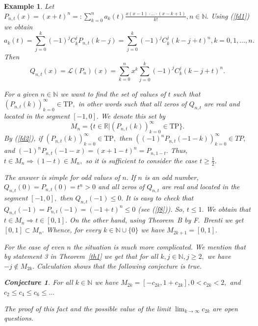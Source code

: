 \documentclass[12pt]{amsart}
\newcounter{count}
\numberwithin{count}{section}
\newtheorem{Example}[count]{Example}
\newtheorem{Conjecture}[count]{Conjecture}
\begin{document}
\begin{Example}
\label{ex2d} 
Let $P_{n, t}(x) =\left(x + t\right)^n =:
\sum_{k=0}^n a_k(t)   \frac{x(x-1)\cdot \ldots \cdot (x-k+1)}{k!}, 
n\in \mathbb{N}.$ Using (\ref{fd1}) we obtain
$$ a_k(t)=  \sum_{j=0}^k (-1)^j   C_k^j P_{n, t}(k-j) = \sum_{j=0}^k (-1)^j   C_k^j 
(k-j+t)^n,  k= 0, 1,  \ldots, n.
 $$
 Then
 $$ Q_{n, t}(x)= \mathcal{L}(P_n)(x) = \sum_{k=0}^n x^k  \sum_{j=0}^k (-1)^j   C_k^j 
(k-j+t)^n.$$

For a given $n\in \mathbb{N}$ we want to find the set of values of $t$ such that 
$(P_{n, t}(k))_{k=0}^\infty \in \mathrm{TP}, $ in other words such that all zeros of $ Q_{n, t}$
are real and located in the segment $[-1, 0].$ We denote this set by 
$$M_n = \{ t\in \mathbb{R} | (P_{n, t}(k))_{k=0}^\infty \in \mathrm{TP}   \}.$$
By (\ref{fd2}), if $(P_{n, t}(k))_{k=0}^\infty \in \mathrm{TP},$ then $((-1)^n P_{n, t}(-1-k))_{k=0}^\infty \in TP,$
and $(-1)^n P_{n, t}(-1-x) =(x+1-t)^n =P_{n, 1-t}.$ Thus, $t\in M_n \Rightarrow (1-t)\in M_n,$
so it is sufficient to consider the case $t \geq \frac{1}{2}.$

The answer is simple for odd  values of $n.$  If $n$ is an odd number, $Q_{n, t}(0)=P_{n, t}(0)= t^n >0$  and 
all zeros of $ Q_{n, t}$ are real and located in the segment $[-1, 0], $ then  $Q_{n, t}(-1)\leq 0.$
It is easy to check that $Q_{n, t}(-1)  = P_{n, t}(-1) =(-1+t)^n \leq 0$  (see (\ref{f8})). So, $t\leq 1.$
We obtain that $t\in M_n \Rightarrow t \in [0, 1].$ On the other hand, using Theorem~B by F.~Brenti 
we get $[0, 1] \subset M_n.$ Whence, for every $k\in \mathbb{N}\cup\{0\}$ we have $M_{2k+1} = [0, 1].$

For the case of even $n$ the situation is much more complicated. We mention that by statement 3 in Theorem~\ref{th1} we get that for all $k, j\in \mathbb{N}, j \geq 2,$
we have $-j \notin M_{2k}.$ Calculation shows that the following conjecture is true.

\begin{Conjecture} For all  $k\in \mathbb{N}$ we have $M_{2k} = [-c_{2k}, 1+ c_{2k}], 0 < c_{2k} <2,$ and $c_2 \leq c_4 \leq c_6 \leq \ldots$ 
\end{Conjecture}

The proof of this fact and the possible value of the limit $\lim_{k\to \infty} c_{2k} $ are open questions. 

\end{Example} 
\end{document}
